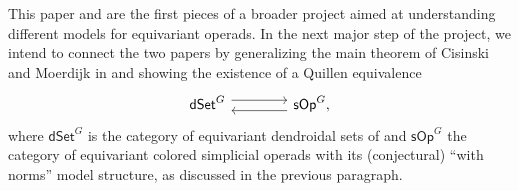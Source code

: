 \documentclass[a4paper,10pt
,draft
]{article}%
\numberwithin{equation}{section}
\numberwithin{figure}{section}
\theoremstyle{definition} %
\newcommand{\1}{\ensuremath{\mathbbm 1}}%
\begin{document}
This paper and \cite{Pe17} are the first pieces of a broader project aimed at understanding different models for equivariant operads. 
In the next major step of the project, 
we intend to connect the two papers by
generalizing the main theorem of
Cisinski and Moerdijk in \cite{CM13b} and 
 showing the existence of a Quillen equivalence
\begin{equation}
\begin{tikzcd}[column sep =4em]
	\mathsf{dSet}^G \ar[shift left=1.5]{r} 
	&
	\mathsf{sOp}^G,
	\ar[shift left=1.5]{l}
\end{tikzcd}
\end{equation} 
where $\mathsf{dSet}^G$ is the
category of equivariant dendroidal sets of
\cite{Pe17} and 
$\mathsf{sOp}^G$ the category of equivariant colored simplicial operads with its (conjectural) ``with norms'' model structure,
as discussed in the previous paragraph.







\end{document}
